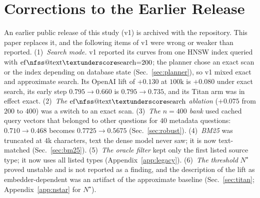 \documentclass{ieeeaccess}
\makeatletter
\DeclareRobustCommand{\_}{\ifmmode\nfss@text{\textunderscore}\else\textunderscore\allowbreak\fi}
\makeatother
\begin{document}




\section{Corrections to the Earlier Release}
\label{app:corrections}
An earlier public release of this study (v1) is archived with the repository. This paper replaces it, and the following items of v1 were wrong or weaker than reported. (1)~\emph{Search mode.} v1 reported its curves from one HNSW index queried with $\mathrm{ef\_search}{=}200$; the planner chose an exact scan or the index depending on database state (Sec.~\ref{sec:planner}), so v1 mixed exact and approximate search. Its OpenAI lift of $+0.130$ at $100\text{k}$ is $+0.080$ under exact search, its early step $0.795{\to}0.660$ is $0.795{\to}0.735$, and its Titan arm was in effect exact. (2)~\emph{The $\mathrm{ef\_search}$ ablation} ($+0.075$ from $200$ to $400$) was a switch to an exact scan. (3)~\emph{The $n{=}400$ bank} used cached query vectors that belonged to other questions for $40$ metadata questions: $0.710{\to}0.468$ becomes $0.7725{\to}0.5675$ (Sec.~\ref{sec:robust}). (4)~\emph{BM25} was truncated at $4$k characters, text the dense model never saw; it is now text-matched (Sec.~\ref{sec:bm25}). (5)~\emph{The oracle filter} kept only the first listed source type; it now uses all listed types (Appendix~\ref{app:legacy}). (6)~\emph{The threshold} $N^\star$ proved unstable and is not reported as a finding, and the description of the lift as embedder-dependent was an artifact of the approximate baseline (Sec.~\ref{sec:titan}; Appendix~\ref{app:nstar} for $N^\star$).
\end{document}
